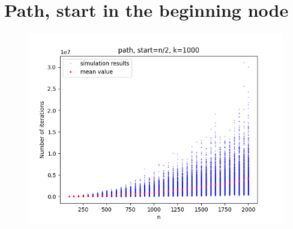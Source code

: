 \documentclass{article}
\begin{document}
\section{Path, start in the beginning node}
\begin{figure}[htp]
  \centering
    \includegraphics[width=0.5\linewidth]{path_beginning.png}
    \label{fig:path_beginning}
\end{figure}
\end{document}
